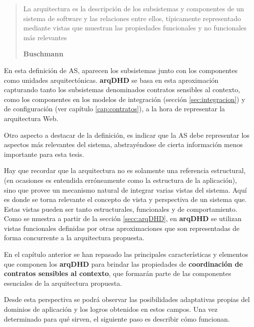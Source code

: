 \begin{quote}

La arquitectura es la descripción de los subsistemas y componentes de
un sistema de software y las relaciones entre ellos, típicamente representado mediante vistas que muestran las propiedades funcionales y no funcionales más relevantes  

\begin{flushright} \textbf{Buschmann} \cite{arqModulos} \end{flushright}

\end{quote}


En esta definición de AS, aparecen los subsistemas junto con los componentes como unidades arquitectónicas. \textbf{arqDHD} se basa en esta aproximación capturando tanto los subsistemas denominados contratos sensibles al contexto, como los componentes en los modelos de integración (sección \ref{sec:integracion}) y de configuración (ver capítulo \ref{cap:contratos}), a la hora de representar la arquitectura Web.

Otro aspecto a destacar de la definición, es indicar que la AS debe representar los aspectos más relevantes del sistema, abstrayéndose de cierta información menos importante para esta tesis.

Hay que recordar que la arquitectura no es solamente una referencia estructural, (en ocasiones es entendida erróneamente como la estructura de la aplicación), sino que provee un mecanismo natural de integrar varias vistas del sistema. Aquí  es donde se torna relevante el concepto de vista y perspectiva de un sistema que.   Estas vistas pueden ser tanto estructurales, funcionales y de comportamiento. Como se muestra a partir de la sección \ref{secc:arqDHD}, en \textbf{arqDHD} se utilizan vistas funcionales definidas por otras aproximaciones que son representadas de forma concurrente a la arquitectura propuesta. 

En el capítulo anterior se han repasado las principales características y elementos que componen los \textbf{arqDHD} para brindar las propiedades de \textbf{coordinación de contratos sensibles al contexto}, que formarán parte de las componentes esenciales de la arquitectura propuesta.

Desde esta perspectiva se podrá observar las posibilidades adaptativas propias del dominios de aplicación y los logros obtenidos en estos campos. Una vez determinado para qué sirven, el siguiente paso es describir cómo funcionan. 

